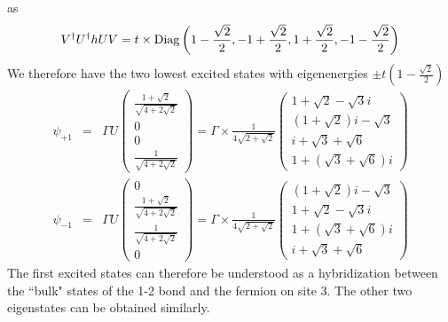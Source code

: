 \documentclass[aps,prb,showpacs,amsmath,amssymb,superscriptaddress]{revtex4-2}
\begin{document}
as
\begin{eqnarray}
	V^\dag U^\dag h U V =t\times {\rm Diag}\left( 1 -\frac{\sqrt{2}}{2},  -1 +\frac{\sqrt{2}}{2},  1 +\frac{\sqrt{2}}{2},  -1 -\frac{\sqrt{2}}{2} \right)
\end{eqnarray}
We therefore have the two lowest excited states with eigenenergies $\pm t(1-\frac{\sqrt{2}}{2})$
\begin{eqnarray}
	\psi_{+1} &=& \Gamma U \begin{pmatrix}
	\frac{1+ \sqrt{2}}{\sqrt{4+2\sqrt{2}}} \\
0  \\
0 \\
\frac{1}{\sqrt{4+2\sqrt{2}}}
	\end{pmatrix} = \Gamma \times \frac{1}{4\sqrt{2+\sqrt{2}}} \begin{pmatrix}
	1+\sqrt{2}-\sqrt{3} i \\
	(1+\sqrt{2})i-\sqrt{3}  \\
	i+ \sqrt{3} + \sqrt{6} \\
	1 + (\sqrt{3} + \sqrt{6})i
\end{pmatrix} \\\nonumber
	\psi_{-1} &=& \Gamma  U \begin{pmatrix}
		0\\
	\frac{1+ \sqrt{2}}{\sqrt{4+2\sqrt{2}}} \\
	\frac{1}{\sqrt{4+2\sqrt{2}}} \\
	0
\end{pmatrix} = \Gamma \times \frac{1}{4\sqrt{2+\sqrt{2}}} \begin{pmatrix}
	(1+\sqrt{2})i-\sqrt{3} \\
	1+\sqrt{2}-\sqrt{3} i \\
	1+ (\sqrt{3} + \sqrt{6} )i\\
    i + \sqrt{3} + \sqrt{6}
\end{pmatrix}
\end{eqnarray}
The first excited states can therefore be understood as a hybridization between the ``bulk" states of the 1-2 bond and the fermion on site 3. The other two eigenstates can be obtained similarly.
\end{document}
